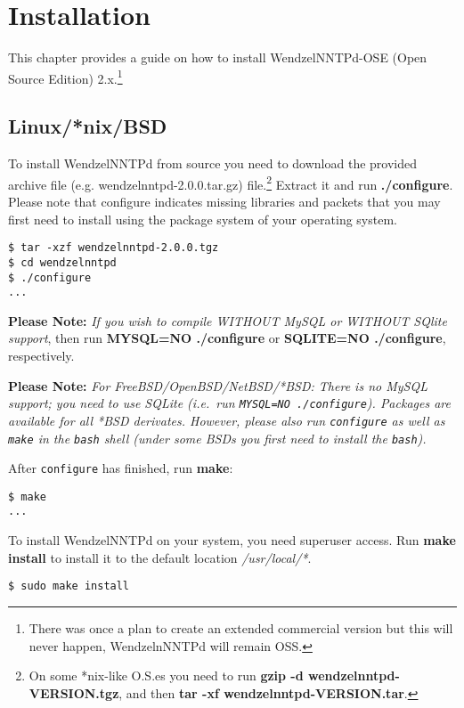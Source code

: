 \chapter{Installation}

This chapter provides a guide on how to install WendzelNNTPd-OSE (Open Source Edition) 2.x.\footnote{There was once a plan to create an extended commercial version but this will never happen, WendzelnNNTPd will remain OSS.}

\section{Linux/*nix/BSD}

To install WendzelNNTPd from source you need to download the provided archive file (e.g. wendzelnntpd-2.0.0.tar.gz) file.\footnote{On some *nix-like O.S.es you need to run {\bf gzip -d wendzelnntpd-VERSION.tgz}, and then {\bf tar -xf wendzelnntpd-VERSION.tar}.} Extract it and run {\bf ./configure}. Please note that configure indicates missing libraries and packets that you may first need to install using the package system of your operating system.

\begin{verbatim}
$ tar -xzf wendzelnntpd-2.0.0.tgz
$ cd wendzelnntpd
$ ./configure
...
\end{verbatim}

{\bf Please Note:} {\it If you wish to compile WITHOUT MySQL or WITHOUT SQlite support}, then run {\bf MYSQL=NO ./configure} or {\bf SQLITE=NO ./configure}, respectively.

{\bf Please Note:} {\it For FreeBSD/OpenBSD/NetBSD/*BSD: There is no MySQL support; you need to use SQLite (i.e.\ run \texttt{MYSQL=NO ./configure}). Packages are available for all *BSD derivates. However, please also run \texttt{configure} as well as \texttt{make} in the \texttt{bash} shell (under some BSDs you first need to install the \texttt{bash}).}

After \texttt{configure} has finished, run {\bf make}:

\begin{verbatim}
$ make
...
\end{verbatim}

To install WendzelNNTPd on your system, you need superuser access. Run {\bf make install} to install it to the default location {\it /usr/local/*}.

\begin{verbatim}
$ sudo make install
\end{verbatim}

